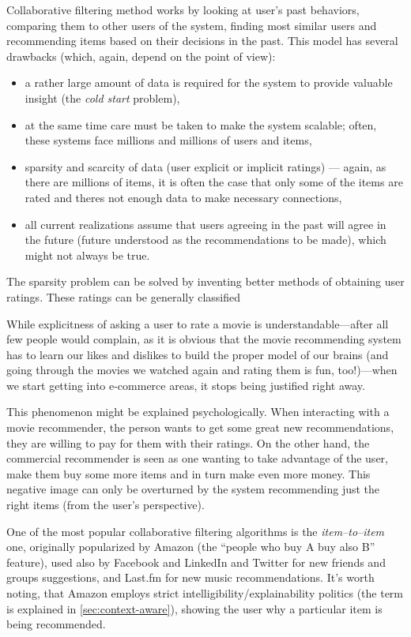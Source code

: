 Collaborative filtering method works by looking at user's past behaviors, comparing them to other users of the system, finding most similar users and recommending items based on their decisions in the past. This model has several drawbacks (which, again, depend on the point of view):

\begin{itemize}
	\item a rather large amount of data is required for the system to provide valuable insight (the \emph{cold start} problem),
	\item at the same time care must be taken to make the system scalable; often, these systems face millions and millions of users and items,
	\item sparsity and scarcity of data (user explicit or implicit ratings) --- again, as there are millions of items, it is often the case that only some of the items are rated and theres not enough data to make necessary connections,
	\item all current realizations assume that users agreeing in the past will agree in the future (future understood as the recommendations to be made), which might not always be true.
\end{itemize}

The sparsity problem can be solved by inventing better methods of obtaining user ratings. These ratings can be generally classified 

While explicitness of asking a user to rate a movie is understandable---after all few people would complain, as it is obvious that the movie recommending system has to learn our likes and dislikes to build the proper model of our brains (and going through the movies we watched again and rating them is fun, too!)---when we start getting into e-commerce areas, it stops being justified right away.

This phenomenon might be explained psychologically. When interacting with a movie recommender, the person wants to get some great new recommendations, they are willing to pay for them with their ratings. On the other hand, the commercial recommender is seen as one wanting to take advantage of the user, make them buy some more items and in turn make even more money. This negative image can only be overturned by the system recommending just the right items (from the user's perspective).

One of the most popular collaborative filtering algorithms is the \emph{item--to--item} one, originally popularized by Amazon (the ``people who buy A buy also B'' feature), used also by Facebook and LinkedIn and Twitter for new friends and groups suggestions, and Last.fm for new music recommendations. It's worth noting, that Amazon employs strict intelligibility/explainability politics (the term is explained in \cref{sec:context-aware}), showing the user why a particular item is being recommended.

